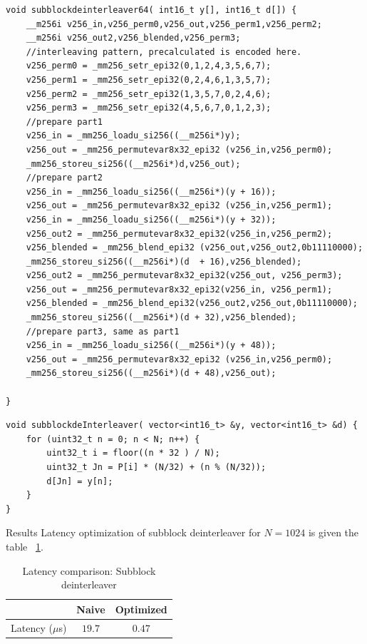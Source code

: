 \begin{code}
\label{code:subblockDeinterleaver}
\begin{verbatim}
void subblockdeinterleaver64( int16_t y[], int16_t d[]) {
	__m256i v256_in,v256_perm0,v256_out,v256_perm1,v256_perm2;
	__m256i v256_out2,v256_blended,v256_perm3;
	//interleaving pattern, precalculated is encoded here.
	v256_perm0 = _mm256_setr_epi32(0,1,2,4,3,5,6,7);
	v256_perm1 = _mm256_setr_epi32(0,2,4,6,1,3,5,7);
	v256_perm2 = _mm256_setr_epi32(1,3,5,7,0,2,4,6);
	v256_perm3 = _mm256_setr_epi32(4,5,6,7,0,1,2,3);
	//prepare part1
	v256_in = _mm256_loadu_si256((__m256i*)y);
	v256_out = _mm256_permutevar8x32_epi32 (v256_in,v256_perm0);
	_mm256_storeu_si256((__m256i*)d,v256_out);
	//prepare part2
	v256_in = _mm256_loadu_si256((__m256i*)(y + 16));
	v256_out = _mm256_permutevar8x32_epi32 (v256_in,v256_perm1);
	v256_in = _mm256_loadu_si256((__m256i*)(y + 32));
	v256_out2 = _mm256_permutevar8x32_epi32(v256_in,v256_perm2);
	v256_blended = _mm256_blend_epi32 (v256_out,v256_out2,0b11110000);
	_mm256_storeu_si256((__m256i*)(d  + 16),v256_blended);
	v256_out2 = _mm256_permutevar8x32_epi32(v256_out, v256_perm3);
	v256_out = _mm256_permutevar8x32_epi32(v256_in, v256_perm1);
	v256_blended = _mm256_blend_epi32(v256_out2,v256_out,0b11110000);
	_mm256_storeu_si256((__m256i*)(d + 32),v256_blended);
	//prepare part3, same as part1
	v256_in = _mm256_loadu_si256((__m256i*)(y + 48));
	v256_out = _mm256_permutevar8x32_epi32 (v256_in,v256_perm0);
	_mm256_storeu_si256((__m256i*)(d + 48),v256_out);
		
}
\end{verbatim}
\end{code}

\begin{code}
\label{code:slowSubblockDeinterleaver}
\begin{verbatim}
void subblockdeInterleaver( vector<int16_t> &y, vector<int16_t> &d) {
	for (uint32_t n = 0; n < N; n++) {
		uint32_t i = floor((n * 32 ) / N);
		uint32_t Jn = P[i] * (N/32) + (n % (N/32));
		d[Jn] = y[n];
	}
}
\end{verbatim}
\end{code}

Results Latency optimization of subblock deinterleaver for $N = 1024$ is given the table ~\ref{tab:subblockDeinterleaverLatency}.
\begin{table}[!h]
	\begin{center}
		\caption{Latency comparison: Subblock deinterleaver}
		\label{tab:subblockDeinterleaverLatency}
		\begin{tabular}{c|c|c} %
			\textbf{ } & Naive & Optimized \\
			\hline
			Latency ($\mu$s) & $19.7$ & $0.47$\\
		\end{tabular}
	\end{center}
\end{table}


